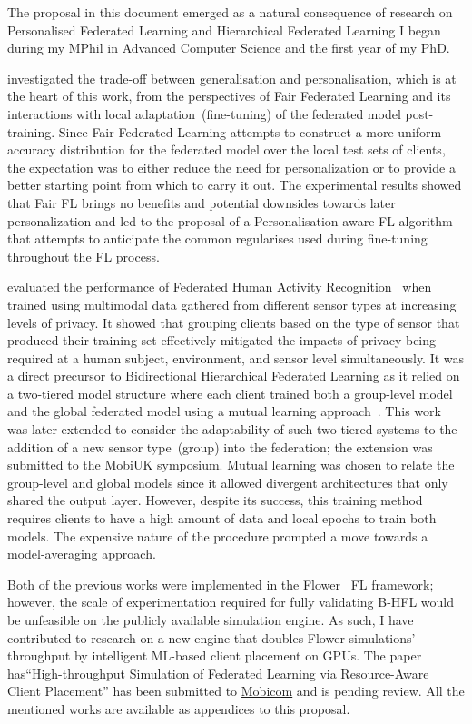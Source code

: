 The proposal in this document emerged as a natural consequence of research on Personalised Federated Learning and Hierarchical Federated Learning I began during my MPhil in Advanced Computer Science and the first year of my PhD.

\citet{EuroMLSysWorkshop} investigated the trade-off between generalisation and personalisation, which is at the heart of this work, from the perspectives of Fair Federated Learning and its interactions with local adaptation~(fine-tuning) of the federated model post-training. Since Fair Federated Learning attempts to construct a more uniform accuracy distribution for the federated model over the local test sets of clients, the expectation was to either reduce the need for personalization or to provide a better starting point from which to carry it out. The experimental results showed that Fair FL brings no benefits and potential downsides towards later personalization and led to the proposal of a Personalisation-aware FL algorithm that attempts to anticipate the common regularises used during fine-tuning throughout the FL process.

\citet{OperaWorkshop} evaluated the performance of Federated Human Activity Recognition~\citep{HARusingFL_2018} when trained using multimodal data gathered from different sensor types at increasing levels of privacy. It showed that grouping clients based on the type of sensor that produced their training set effectively mitigated the impacts of privacy being required at a human subject, environment, and sensor level simultaneously. It was a direct precursor to Bidirectional Hierarchical Federated Learning as it relied on a two-tiered model structure where each client trained both a group-level model and the global federated model using a mutual learning approach~\citep{DeepMutualLearning}. This work was later extended to consider the adaptability of such two-tiered systems to the addition of a new sensor type~(group) into the federation; the extension was submitted to the \href{https://mobiuk.org/2023}{MobiUK} symposium. Mutual learning was chosen to relate the group-level and global models since it allowed divergent architectures that only shared the output layer. However, despite its success, this training method requires clients to have a high amount of data and local epochs to train both models. The expensive nature of the procedure prompted a move towards a model-averaging approach.

Both of the previous works were implemented in the Flower~\citep{Flower} FL framework; however, the scale of experimentation required for fully validating B-HFL would be unfeasible on the publicly available simulation engine. As such, I have contributed to research on a new engine that doubles Flower simulations' throughput by intelligent ML-based client placement on GPUs. The paper has``High-throughput Simulation of Federated Learning via Resource-Aware Client Placement'' has been submitted to \href{https://sigmobile.org/mobicom/2023/}{Mobicom} and is pending review. All the mentioned works are available as appendices to this proposal.


